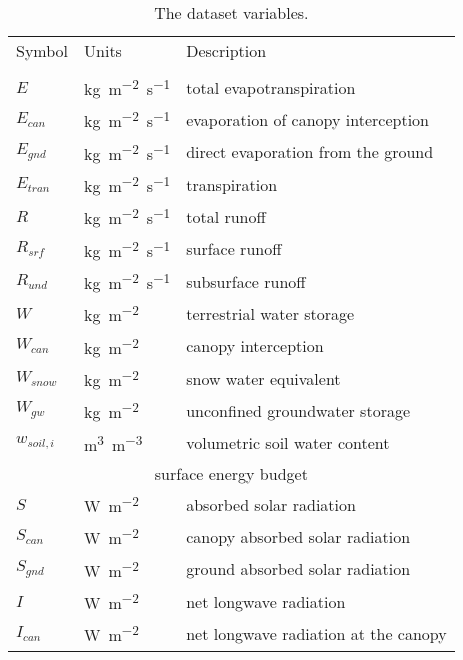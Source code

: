 \begin{table}[t]
    \caption{The dataset variables.}
    \label{tbl:variables}
    \centering
    \begin{tabular}{lll}
        \tophline
        Symbol       & Units                   & Description \\
        \middlehline
        \multicolumn{3}{c}{surface water budget}                                            \\
        $E$          & \unit{kg~m^{-2}~s^{-1}} & total evapotranspiration \\
        $E_{can}$    & \unit{kg~m^{-2}~s^{-1}} & evaporation of canopy interception \\
        $E_{gnd}$    & \unit{kg~m^{-2}~s^{-1}} & direct evaporation from the ground \\
        $E_{tran}$   & \unit{kg~m^{-2}~s^{-1}} & transpiration \\
        $R$          & \unit{kg~m^{-2}~s^{-1}} & total runoff \\
        $R_{srf}$    & \unit{kg~m^{-2}~s^{-1}} & surface runoff \\
        $R_{und}$    & \unit{kg~m^{-2}~s^{-1}} & subsurface runoff \\
        $W$          & \unit{kg~m^{-2}}        & terrestrial water storage \\
        $W_{can}$    & \unit{kg~m^{-2}}        & canopy interception \\
        $W_{snow}$   & \unit{kg~m^{-2}}        & snow water equivalent \\
        $W_{gw}$     & \unit{kg~m^{-2}}        & unconfined groundwater storage \\
        $w_{soil,i}$ & \unit{m^3~m^{-3}}       & volumetric soil water content \\
        [1mm]
        \multicolumn{3}{c}{surface energy budget}                                           \\
        $S$          & \unit{W~m^{-2}}         & absorbed solar radiation \\
        $S_{can}$    & \unit{W~m^{-2}}         & canopy absorbed solar radiation \\
        $S_{gnd}$    & \unit{W~m^{-2}}         & ground absorbed solar radiation \\
        $I$          & \unit{W~m^{-2}}         & net longwave radiation \\
        $I_{can}$    & \unit{W~m^{-2}}         & net longwave radiation at the canopy \\

\end{tabular}
\end{table}
